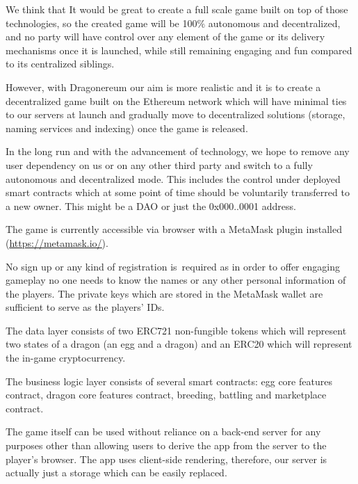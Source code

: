 \documentclass[12pt]{article}
\begin{document}
We think that It would be great to create a full scale game built on top of those technologies,  so the created game will be 100$\%$  autonomous and decentralized, and no party will have control over any element of the game or its delivery mechanisms once it is launched, while still remaining engaging and fun compared to its centralized siblings.\par

However, with Dragonereum our aim is more realistic and it is to create a decentralized game built on the Ethereum network which will have minimal ties to our servers at launch and gradually move to decentralized solutions (storage, naming services and indexing) once the game is released.\par

In the long run and with the advancement of technology, we hope to remove any user dependency on us or on any other third party and switch to a fully autonomous and decentralized mode. This includes the control under deployed smart contracts which at some point of time should be voluntarily transferred to a new owner. This might be a DAO or just the 0x000..0001 address.\par

The game is currently accessible via browser with a MetaMask plugin installed (\href{https://metamask.io/}{\textcolor[HTML]{1155CC}{\uline{https://metamask.io/}}}).\par

No sign up or any kind of registration is\ required as in order to offer engaging gameplay no one  needs to know the names or any other personal information of the players. The private keys which are stored in the MetaMask wallet are sufficient to serve as the players’ IDs.\par

The data layer consists of two ERC721  \cite{Ethereum_2017_Sep_26}  non-fungible tokens which will represent two states of a dragon (an egg and a dragon) and an ERC20  \cite{Ethereum_2015_Nov_19}  which will represent the in-game cryptocurrency. \par

The business logic layer consists of several smart contracts: egg core features contract, dragon core features contract, breeding, battling and marketplace contract.\par

The game itself can be used without reliance on a back-end server for any purposes other than allowing users to derive the app from the server to the player’s browser. The app uses client-side rendering, therefore, our server is actually just a storage which can be easily replaced.\par
\end{document}
